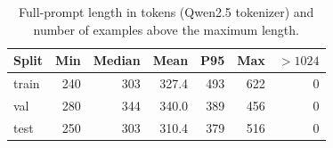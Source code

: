 \begin{table}[t]\centering\small
\caption{Full-prompt length in tokens (Qwen2.5 tokenizer) and number of examples above the maximum length.}\label{tab:toklen}
\begin{tabular}{lrrrrrr}
\toprule
Split & Min & Median & Mean & P95 & Max & $>1024$ \\
\midrule
train & 240 & 303 & 327.4 & 493 & 622 & 0 \\
val & 280 & 344 & 340.0 & 389 & 456 & 0 \\
test & 250 & 303 & 310.4 & 379 & 516 & 0 \\
\bottomrule
\end{tabular}
\end{table}
